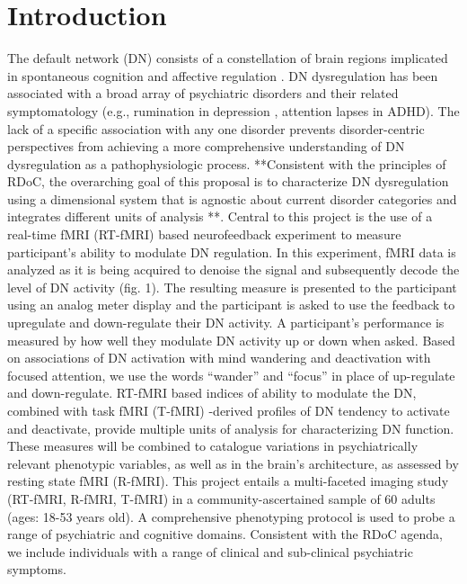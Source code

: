 \section{Introduction}

The default network (DN) consists of a constellation of brain regions implicated in spontaneous cognition and affective regulation \cite{Raichle_2015}. DN dysregulation has been associated with a broad array of psychiatric disorders and their related symptomatology (e.g., rumination in depression \cite{Sheline2009}, attention lapses in ADHD). The lack of a specific association with any one disorder prevents disorder-centric perspectives from achieving a more comprehensive understanding of DN dysregulation as a pathophysiologic process. **Consistent with the principles of RDoC, the overarching goal of this proposal is to characterize DN dysregulation using a dimensional system that is agnostic about current disorder categories and integrates different units of analysis \cite{Insel2010}**. Central to this project is the use of a real-time fMRI (RT-fMRI) based neurofeedback experiment to measure participant's ability to modulate DN regulation. In this experiment, fMRI data is analyzed as it is being acquired to denoise the signal and subsequently decode the level of DN activity (fig. 1). The resulting measure is presented to the participant using an analog meter display and the participant is asked to use the feedback to upregulate and down-regulate their DN activity. A participant's performance is measured by how well they modulate DN activity up or down when asked. Based on associations of DN activation with mind wandering and deactivation with focused attention, we use the words ``wander'' and ``focus'' in place of up-regulate and down-regulate. RT-fMRI based indices of ability to modulate the DN, combined with task fMRI (T-fMRI) -derived profiles of DN tendency to activate and deactivate, provide multiple units of analysis for characterizing DN function. These measures will be combined to catalogue variations in psychiatrically relevant phenotypic variables, as well as in the brain's architecture, as assessed by resting state fMRI (R-fMRI). This project entails a multi-faceted imaging study (RT-fMRI, R-fMRI, T-fMRI) in a community-ascertained sample of 60 adults (ages: 18-53 years old)\cite{Nooner2012}. A comprehensive phenotyping protocol is used to probe a range of psychiatric and cognitive domains. Consistent with the RDoC agenda, we include individuals with a range of clinical and sub-clinical psychiatric symptoms.


